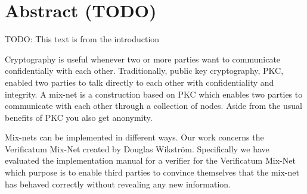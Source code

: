 \section{Abstract (TODO)}

TODO: This text is from the introduction

Cryptography is useful whenever two or more parties want to communicate confidentially with each other. Traditionally, public key cryptography, PKC, enabled two parties to talk directly to each other with confidentiality and integrity. A mix-net is a construction based on PKC which enables two parties to communicate with each other through a collection of nodes. Aside from the usual benefits of PKC you also get anonymity.

Mix-nets can be implemented in different ways. Our work concerns the Verificatum Mix-Net created by Douglas Wikström. Specifically we have evaluated the implementation manual for a verifier for the Verificatum Mix-Net which purpose is to enable third parties to convince themselves that the mix-net has behaved correctly without revealing any new information.